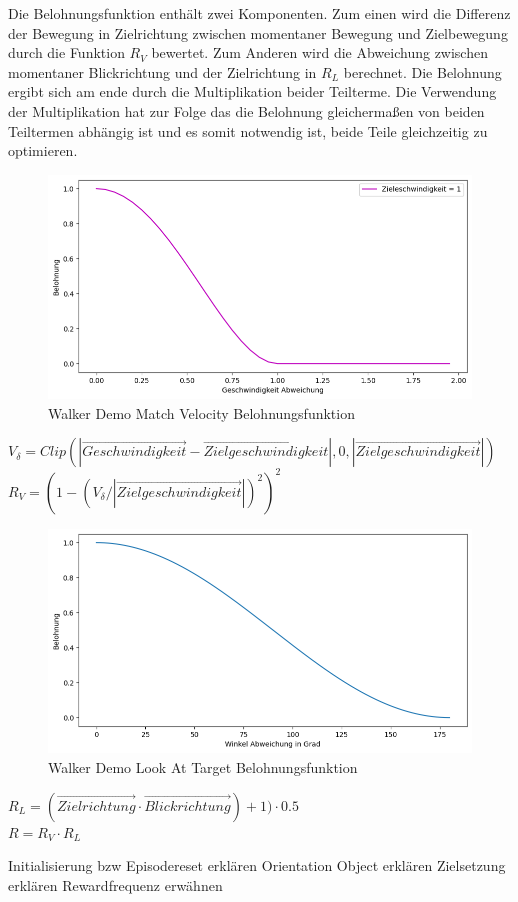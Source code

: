 Die Belohnungsfunktion enthält zwei Komponenten. Zum einen wird die Differenz der Bewegung in Zielrichtung zwischen momentaner Bewegung und Zielbewegung durch die Funktion $R_V$ bewertet. Zum Anderen wird die Abweichung zwischen momentaner Blickrichtung und der Zielrichtung in $R_L$ berechnet. Die Belohnung ergibt sich am ende durch die Multiplikation beider Teilterme. Die Verwendung der Multiplikation hat zur Folge das die Belohnung gleichermaßen von beiden Teiltermen abhängig ist und es somit notwendig ist, beide Teile gleichzeitig zu optimieren.\\
\begin{figure}[H]
  \centering  
  \includegraphics[scale=0.5]{img/match_velocity_original_vel1.png}
  \caption{Walker Demo Match Velocity Belohnungsfunktion}
  \label{fig:match_velocity_original_vel1}
\end{figure}
$V_\delta=Clip(|\vec{Geschwindigkeit} - \vec{Zielgeschwindigkeit}|, 0, |\vec{Zielgeschwindigkeit}|)$ \\
$R_V=(1 - (V_\delta / |\vec{Zielgeschwindigkeit}|)^2)^2$ \\
\begin{figure}[H]
  \centering  
  \includegraphics[scale=0.5]{img/look_at_target_original.png}
  \caption{Walker Demo Look At Target Belohnungsfunktion}
  \label{fig:look_at_target_original}
\end{figure}
$R_L=(\vec{Zielrichtung} \cdot \vec{Blickrichtung})+ 1) \cdot 0.5$ \\
$R=R_V \cdot R_L$

Initialisierung bzw Episodereset erklären
Orientation Object erklären
Zielsetzung erklären
Rewardfrequenz erwähnen